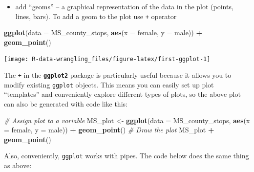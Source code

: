 \documentclass[]{book}
\newenvironment{Shaded}{\begin{snugshade}}{\end{snugshade}}
\newcommand{\CommentTok}[1]{\textcolor[rgb]{0.56,0.35,0.01}{\textit{#1}}}
\newcommand{\DataTypeTok}[1]{\textcolor[rgb]{0.13,0.29,0.53}{#1}}
\newcommand{\KeywordTok}[1]{\textcolor[rgb]{0.13,0.29,0.53}{\textbf{#1}}}
\newcommand{\NormalTok}[1]{#1}
\newcommand{\OperatorTok}[1]{\textcolor[rgb]{0.81,0.36,0.00}{\textbf{#1}}}
\newcommand{\StringTok}[1]{\textcolor[rgb]{0.31,0.60,0.02}{#1}}
\providecommand{\tightlist}{%
  \setlength{\itemsep}{0pt}\setlength{\parskip}{0pt}}
\begin{document}
\begin{itemize}
\tightlist
\item
  add ``geoms'' -- a graphical representation of the data in the plot (points, lines, bars). To add a geom to the plot use \texttt{+} operator
\end{itemize}

\begin{Shaded}
\begin{Highlighting}[]
\KeywordTok{ggplot}\NormalTok{(}\DataTypeTok{data =}\NormalTok{ MS_county_stops, }\KeywordTok{aes}\NormalTok{(}\DataTypeTok{x =}\NormalTok{ female, }\DataTypeTok{y =}\NormalTok{ male)) }\OperatorTok{+}
\StringTok{  }\KeywordTok{geom_point}\NormalTok{()}
\end{Highlighting}
\end{Shaded}

\texttt{[image: R-data-wrangling\_files/figure-latex/first-ggplot-1]}

The \texttt{+} in the \textbf{\texttt{ggplot2}} package is particularly useful because it allows you
to modify existing \texttt{ggplot} objects. This means you can easily set up plot
``templates'' and conveniently explore different types of plots, so the above
plot can also be generated with code like this:

\begin{Shaded}
\begin{Highlighting}[]
\CommentTok{# Assign plot to a variable}
\NormalTok{MS_plot <-}\StringTok{ }\KeywordTok{ggplot}\NormalTok{(}\DataTypeTok{data =}\NormalTok{ MS_county_stops, }\KeywordTok{aes}\NormalTok{(}\DataTypeTok{x =}\NormalTok{ female, }\DataTypeTok{y =}\NormalTok{ male)) }\OperatorTok{+}
\StringTok{  }\KeywordTok{geom_point}\NormalTok{()}
\CommentTok{# Draw the plot}
\NormalTok{MS_plot }\OperatorTok{+}\StringTok{ }\KeywordTok{geom_point}\NormalTok{()}
\end{Highlighting}
\end{Shaded}

Also, conveniently, \texttt{ggplot} works with pipes. The code below does the same thing as above:

\begin{Shaded}
\end{Shaded}
\end{document}
